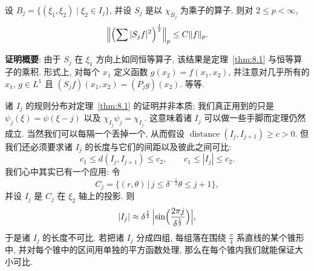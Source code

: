 \begin{corollary}\label{cor:8.2}
设 $B_j=\{(\xi_1,\xi_2) \mid \xi_2\in I_j\}$, 并设 $S_j$ 是以 $\chi_{B_j}$ 为乘子的算子. 则对 $2\leq p<\infty$,
\[
\Bigl\|\Bigl(\sum|S_{j}f|^{2}\Bigr)^{\frac{1}{2}}\Bigr\|_{p}\leq C\|f\|_{p}.
\]
\end{corollary}

\textbf{证明概要}: 由于 $S_j$ 在 $\xi_1$ 方向上如同恒等算子, 该结果是定理~\ref{thm:8.1} 与恒等算子的乘积. 形式上, 对每个 $x_1$ 定义函数 $g(x_2)=f(x_1,x_2)$, 并注意对几乎所有的 $x_1$, $g\in L^1$ 且 $(S_jf)(x_1,x_2)=(P_jg)(x_2)$. 等等.

\begin{remark}\label{rem:8.3}
诸 $I_j$ 的规则分布对定理~\ref{thm:8.1} 的证明并非本质; 我们真正用到的只是 $\psi_j(\xi)=\psi(\xi-j)$ 以及 $\chi_{I_j}\psi_j=\chi_{I_j}$. 这意味着诸 $I_j$ 可以做一些手脚而定理仍然成立. 当然我们可以每隔一个丢掉一个, 从而假设 $\operatorname{distance}(I_j,I_{j+1})\geq c>0$. 但我们还必须要求诸 $I_j$ 的长度与它们的间距以及彼此之间可比:
\[
c_{1}\leq d(I_{j},I_{j+1})\leq c_{2},
\qquad
c_{1}\leq|I_{j}|\leq c_{2}.
\]
我们心中其实已有一个应用: 令
\[
C_{j}=\bigl\{(r,\theta) \,\big|\, j\leq\delta^{-\frac{1}{2}}\theta\leq j+1\bigr\},
\]
并设 $I_{j}$ 是 $C_{j}$ 在 $\xi_{2}$ 轴上的投影. 则
\[
|I_{j}|\approx\delta^{\frac{1}{2}}\,\Bigl|\sin\Bigl(\frac{2\pi j}{\delta^{\frac{1}{2}}}\Bigr)\Bigr|,
\]
于是诸 $I_j$ 的长度不可比. 若把诸 $I_j$ 分成四组, 每组落在围绕 $\frac{\pi}{4}$ 系直线的某个锥形中, 并对每个锥中的区间用单独的平方函数处理, 那么在每个锥内我们就能保证大小可比.
\end{remark}


